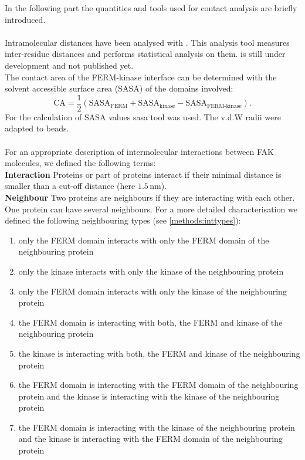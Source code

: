 In the following part the quantities and tools used for contact analysis are briefly introduced.\\
\\
Intramolecular distances have been analysed with \conan{}. This analysis tool measures inter-residue distances and performs statistical analysis on them. \conan{} is still under development and not published yet.\\
The contact area of the FERM-kinase interface can be determined with the solvent accessible surface area (SASA) \autocite{sasaAlg} of the domains involved:
\begin{equation}
\text{CA} = \frac{1}{2} \left(\text{SASA}_\text{FERM} + \text{SASA}_\text{kinase} - \text{SASA}_\text{FERM-kinase}\right).
\end{equation}
For the calculation of SASA values \gromacs{} sasa tool was used. The v.d.W radii were adapted to \martini{} beads.\\
\\
For an appropriate description of intermolecular interactions between FAK molecules, we defined the following terms:\\
\textbf{Interaction} Proteins or part of proteins interact if their minimal distance is smaller than a cut-off distance (here $1.5\,\si{\nano\metre}$).\\
\textbf{Neighbour} Two proteins are neighbours if they are interacting with each other. One protein can have several neighbours. For a more detailed characterisation we defined the following neighbouring types (see \autoref{methods:inttypes}):
\begin{enumerate}[label={type \theenumi:}, leftmargin=*]
	\setcounter{enumi}{0}
	\item only the FERM domain interacts with only the FERM domain of the neighbouring protein
	\item only the kinase interacts with only the kinase of the neighbouring protein
	\item only the FERM domain interacts with only the kinase of the neighbouring protein
	\item the FERM domain is interacting with both, the FERM and kinase of the neighbouring protein
	\item the kinase is interacting with both, the FERM and kinase of the neighbouring protein
	\item the FERM domain is interacting with the FERM domain of the neighbouring protein and the kinase is interacting with the kinase of the neighbouring protein
	\item the FERM domain is interacting with the kinase of the neighbouring protein and the kinase is interacting with the FERM domain of the neighbouring protein
\end{enumerate}
